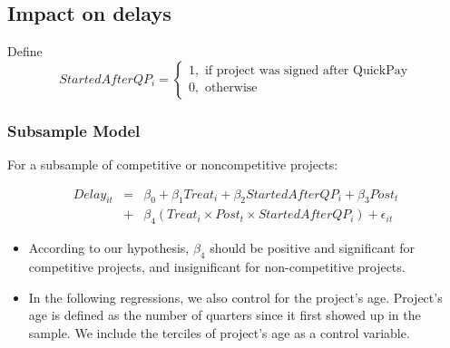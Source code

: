 \documentclass[
]{article}
\providecommand{\tightlist}{%
  \setlength{\itemsep}{0pt}\setlength{\parskip}{0pt}}
\begin{document}
\hypertarget{impact-on-delays}{%
\subsection{Impact on delays}\label{impact-on-delays}}

Define
\[ StartedAfterQP_i = \begin{cases} 1, \text{ if project was signed after QuickPay}\\
0, \text{ otherwise} \end{cases}\]

\hypertarget{subsample-model}{%
\subsubsection{Subsample Model}\label{subsample-model}}

For a subsample of competitive or noncompetitive projects:

\[ \begin{aligned} Delay_{it} &=& \beta_0 +\beta_1 Treat_i+ \beta_2 StartedAfterQP_i+ \beta_3 Post_t \\ &+& \beta_4 (Treat_i \times Post_t \times StartedAfterQP_i )+\epsilon_{it} \end{aligned} \]

\begin{itemize}
\tightlist
\item
  According to our hypothesis, \(\beta_4\) should be positive and
  significant for competitive projects, and insignificant for
  non-competitive projects.
\item
  In the following regressions, we also control for the project's age.
  Project's age is defined as the number of quarters since it first
  showed up in the sample. We include the terciles of project's age as a
  control variable.
\end{itemize}
\end{document}
